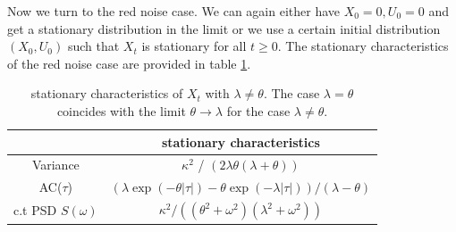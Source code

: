 \documentclass[%
thesis=student,%
coverpage=false,%
titlepage=false,%
headmarks=true, %
english,%
font=libertine, %
math=newpxtx, %
BCOR=5mm,%
coverBCOR=11mm%
]{tumbook}
\begin{document}
Now we turn to the red noise case. We can again either have $X_{0} = 0, U_{0} = 0$ and get a stationary distribution in the limit or we use a certain initial distribution $(X_{0},U_{0})$ such that $X_{t}$ is stationary for all $t \geq 0$. The stationary characteristics of the red noise case are provided in table \ref{tab:red_noise_stat_char}.

\begin{table}[h!]
\centering
\begin{tabular}{|c|c|}
\hline
& stationary characteristics\\
\hline
Variance & $\kappa^2$ / $(2\lambda\theta(\lambda + \theta))$\\
AC($\tau$) & $(\lambda\exp(-\theta\lvert\tau\rvert)-\theta\exp(-\lambda\lvert\tau\rvert))/(\lambda - \theta)$\\
c.t PSD $S(\omega)$ & $\kappa^2/((\theta^2 + \omega^2)(\lambda^2 + \omega^2))$\\
\hline
\end{tabular}
\caption{stationary characteristics of $X_{t}$ with $\lambda \neq \theta$. The case $\lambda = \theta$ coincides with the limit $\theta \rightarrow \lambda$ for the case $\lambda \neq \theta$.}
\label{tab:red_noise_stat_char}
\end{table}
\end{document}
